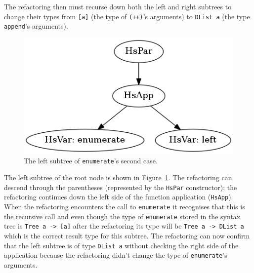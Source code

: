The refactoring then must recurse down both the left and right subtrees to change their types from \texttt{[a]} (the type of \texttt{(++)}'s arguments) to \texttt{DList a} (the type \texttt{append}'s arguments). 

\begin{figure}[h]
	\begin{center}
		\includegraphics[scale=.5]{graphVis/Chapter3/enumLeft.png}
	\end{center}
	\caption{The left subtree of \texttt{enumerate}'s second case.}
	\label{enumLeft}
\end{figure}

The left subtree of the root node is shown in Figure~\ref{enumLeft}. The refactoring can descend through the parentheses (represented by the \texttt{HsPar} constructor); the refactoring continues down the left side of the function application (\texttt{HsApp}). When the refactoring encounters the call to \texttt{enumerate} it recognises that this is the recursive call and even though the type of \texttt{enumerate} stored in the syntax tree is \texttt{Tree a -> [a]} after the refactoring its type will be \texttt{Tree a -> DList a} which is the correct result type  for this subtree. The refactoring can now confirm that the left subtree is of type \texttt{DList a} without checking the right side of the application because the refactoring didn't change the type of \texttt{enumerate}'s arguments.

